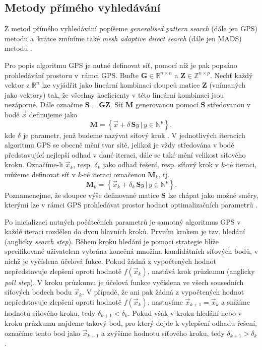 \subsection{Metody přímého vyhledávání}\label{direct-search}
Z metod přímého vyhledávání popíšeme \textit{generalised pattern search} (dále jen GPS) metodu \cite{Audet2002} a~krátce zmíníme také \textit{mesh adaptive direct search} (dále jen MADS) metodu \cite{Audet2006}.

Pro popis algoritmu GPS je nutné definovat síť, pomocí níž je pak popsáno prohledávání prostoru v~rámci GPS. Buďte $ \mathbf{G} \in \mathbb{R}^{n \times n} $ a $ \mathbf{Z} \in \mathbb{Z}^{n \times p} $. Nechť  každý vektor z $ \mathbb{R}^{n} $ lze vyjádřit jako lineární kombinaci sloupců matice $ \mathbf{Z} $ (vnímaných jako vektory) tak, že všechny koeficienty v této lineární kombinaci jsou nezáporné. Dále označme $ \mathbf{S} = \mathbf{G} \mathbf{Z}$. Síť $ \mathbf{M} $ generovanou pomocí $ \mathbf{S} $ středovanou v bodě $ \vec{x} $ definujeme jako
\begin{equation}
	\mathbf{M} = \left\{ \vec{x} + \delta \, \mathbf{S} y \, | \, y \in \mathbb{N}^p \right\},
\end{equation}
kde $ \delta $ je parametr, jenž budeme nazývat síťový krok \cite{BBO-textbook, Audet2002}. V jednotlivých iteracích algoritmu GPS se obecně mění tvar sítě, jelikož je vždy středována v bodě představující nejlepší odhad v dané iteraci, dále se také mění velikost síťového kroku. Označíme-li $ \vec{x}_k $, resp. $ \delta_k $ jako odhad řešení, resp. síťový krok  v $ k $-té iteraci, můžeme definovat síť v $ k $-té iteraci označenou $ \mathbf{M} _k$, tj.
\begin{equation}
	\mathbf{M} _k = \left\{ \vec{x}_k + \delta_k \, \mathbf{S} y \, | \, y \in \mathbb{N}^p \right\}.
\end{equation}
Poznamenejme, že sloupce výše definované matice $ \mathbf{S} $ lze chápat jako možné směry, kterými lze v rámci GPS prohledávat prostor hodnot optimalizačních parametrů \cite{BBO-textbook, Audet2002}.

Po inicializaci nutných počátečních parametrů je samotný algoritmus GPS v každé iteraci rozdělen do dvou hlavních kroků. Prvním krokem je tzv. hledání (anglicky \textit{search step}). Během kroku hledání je pomocí strategie blíže specifikované uživatelem vybrána konečná množina kandidátních síťových bodů, v nichž je vyčíslena účelová fukce. Pokud žádná z vypočtených hodnot nepředstavuje zlepšení oproti hodnotě $ f(\vec{x}_k) $, nastává krok průzkumu (anglicky \textit{poll step}). V kroku průzkumu je účelová funkce vyčíslena ve všech sousedních síťových bodech bodu $ \vec{x}_k $. V případě, že ani pak žádná z vypočtených hodnot nepředstavuje zlepšení oproti hodnotě $ f(\vec{x}_k) $, nastavíme $ \vec{x}_{k+1} = \vec{x}_k $ a snížíme hodnotu síťového kroku, tedy  $ \delta_{k+1} < \delta_k $. Pokud však v kroku hledání nebo v kroku průzkumu najdeme takový bod, pro který dojde k vylepšení odhadu řešení, označíme tento bod jako $ \vec{x}_{k+1} $ a zvýšíme hodnotu síťového kroku, tedy  $ \delta_{k+1} > \delta_k $ \cite{BBO-textbook, Audet2002}.

